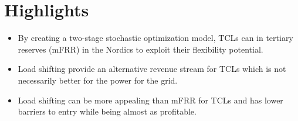 \documentclass{article}
\begin{document}
\section*{Highlights}

\begin{itemize}
    \item By creating a two-stage stochastic optimization model, TCLs can in tertiary reserves (mFRR) in the Nordics to exploit their flexibility potential.
    \item Load shifting provide an alternative revenue stream for TCLs which is not necessarily better for the power for the grid.
    \item Load shifting can be more appealing than mFRR for TCLs and has lower barriers to entry while being almost as profitable.
\end{itemize}
\end{document}
